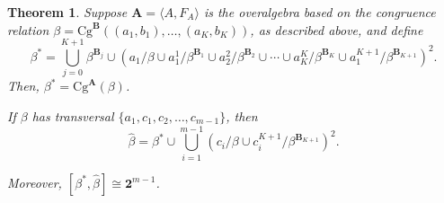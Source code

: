 \documentclass[cm,dissertation]{uhthesis}
\theoremstyle{plain}
\newtheorem{theorem}{Theorem}[section]
\theoremstyle{definition}
\theoremstyle{remark}
\numberwithin{theorem}{section}
\numberwithin{claim}{chapter}
\numberwithin{equation}{section}
\numberwithin{conjecture}{chapter}
\newcommand{\<}{\ensuremath{\langle}}
\renewcommand{\>}{\ensuremath{\rangle}}
\newcommand{\Cg}{\ensuremath{\mathrm{Cg}}}
\newcommand{\0}{\ensuremath{\mathbf{0}}}
\newcommand{\1}{\ensuremath{\mathbf{1}}}
\newcommand{\2}{\ensuremath{\mathbf{2}}}
\newcommand{\3}{\ensuremath{\mathbf{3}}}
\newcommand{\4}{\ensuremath{\mathbf{4}}}
\newcommand{\5}{\ensuremath{\mathbf{5}}}
\newcommand{\bA}{\ensuremath{\mathbf{A}}}
\newcommand{\bB}{\ensuremath{\mathbf{B}}}
\newcommand{\two}{\ensuremath{\mathbf{2}}}
\begin{document}
\begin{theorem}
  \label{OAthm3}
  Suppose $\bA = \< A, F_A\>$ is the overalgebra
  based on the congruence relation $\beta = \Cg^{\bB}((a_1, b_1), \dots, (a_K,b_K))$, as described above,
  and define
  \[ \beta^* = \bigcup_{j=0}^{K+1} \beta^{\bB_j} \cup 
  (a_1/\beta \cup a_1^1/\beta^{\bB_1} \cup a_2^2/\beta^{\bB_2}    \cup \cdots \cup a_K^K/\beta^{\bB_K}\cup a_1^{K+1}/\beta^{\bB_{K+1}})^2.
  \]
  Then, $\beta^* = \Cg^{\bA}(\beta)$.  

  If $\beta$ has transversal $\{a_1, c_1, c_2, \dots, c_{m-1}\}$, then
  \begin{equation}
    \label{eq:OA312}
    \widehat{\beta} = \beta^* \cup \bigcup_{i=1}^{m-1} (c_i/\beta \cup
    c^{K+1}_i/\beta^{\bB_{K+1}})^2.
  \end{equation}

  Moreover, $[\beta^*, \widehat{\beta}] \cong \two^{m-1}$.
\end{theorem}
\end{document}
